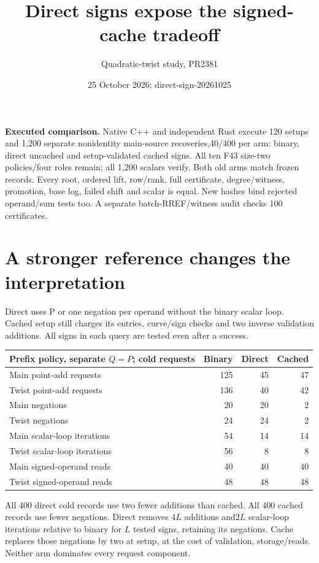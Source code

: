 \documentclass[10pt]{article}
\title{Direct signs expose the signed-cache tradeoff}
\author{Quadratic-twist study, PR2381}
\date{25 October 2026; direct-sign-20261025}
\begin{document}
\sloppy\maketitle
\noindent\textbf{Executed comparison.} Native C++ and independent Rust execute
120 setups and 1,200 separate nonidentity main-source recoveries,40/400 per arm:
binary, direct uncached and setup-validated cached signs. All ten F43 size-two
policies/four roles remain; all 1,200 scalars verify. Both old arms match frozen
records. Every root, ordered lift, row/rank, full certificate, degree/witness,
promotion, base log, failed shift and scalar is equal. New hashes bind rejected
operand/sum tests too. A separate batch-RREF/witness audit checks 100 certificates.

\section*{A stronger reference changes the interpretation}
Direct uses P or one negation per operand without the binary scalar loop.
Cached setup still charges its entries, curve/sign checks and two inverse
validation additions. All signs in each query are tested even after a success.

\begin{center}\begin{tabular}{lrrr}\toprule
Prefix policy, separate $Q=P$; cold requests & Binary & Direct & Cached\\\midrule
Main point-add requests &125&45&47\\
Twist point-add requests &136&40&42\\
Main negations &20&20&2\\
Twist negations &24&24&2\\
Main scalar-loop iterations &54&14&14\\
Twist scalar-loop iterations &56&8&8\\
Main signed-operand reads &40&40&40\\
Twist signed-operand reads &48&48&48\\\bottomrule
\end{tabular}\end{center}
All 400 direct cold records use two fewer additions than cached. All 400 cached
records use fewer negations. Direct removes $4L$ additions and$2L$ scalar-loop
iterations relative to binary for $L$ tested signs, retaining its negations.
Cache replaces those negations by two at setup, at the cost of validation,
storage/reads. Neither arm dominates every request component.
\end{document}
